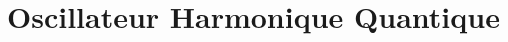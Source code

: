 \documentclass[../notesdecours.tex]{subfiles}
\begin{document}
\part{Oscillateur Harmonique Quantique}
\end{document}
